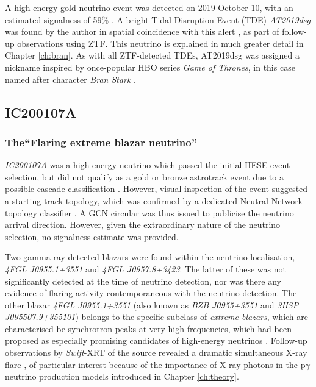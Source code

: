 A high-energy gold neutrino event was detected on 2019 October 10, with an estimated signalness of 59\% . A bright Tidal Disruption Event (TDE) \emph{AT2019dsg} was found by the author in spatial coincidence with this alert , as part of follow-up observations using ZTF. This neutrino is explained in much greater detail in Chapter \ref{ch:bran}. As with all ZTF-detected TDEs, AT2019dsg was assigned a nickname inspired by once-popular HBO series \emph{Game of Thrones}, in this case named after character \emph{Bran Stark} .

\subsection{IC200107A }
\subsubsection{The``Flaring extreme blazar neutrino''}

\emph{IC200107A} was a high-energy neutrino which passed the initial HESE event selection, but did not qualify as a gold or bronze astrotrack event due to a possible cascade classification . However, visual inspection of the event suggested a starting-track topology, which was confirmed by a dedicated Neutral Network topology classifier . A GCN circular was thus issued to publicise the neutrino arrival direction. However, given the extraordinary nature of the neutrino selection, no signalness estimate was provided.

Two gamma-ray detected blazars were found within the neutrino localisation, \emph{4FGL J0955.1+3551} and \emph{4FGL J0957.8+3423}. The latter of these was not significantly detected at the time of neutrino detection, nor was there any evidence of flaring activity contemporaneous with the neutrino detection. The other blazar \emph{4FGL J0955.1+3551} (also known as \emph{BZB J0955+3551} and \emph{3HSP J095507.9+355101}) belongs to the specific subclass of \emph{extreme blazars}, which are characterised be synchrotron peaks at very high-frequencies, which had been proposed as especially promising candidates of high-energy neutrinos . Follow-up observations by \emph{Swift}-XRT of the source revealed a dramatic simultaneous X-ray flare , of particular interest because of the importance of X-ray photons in the p$\gamma$ neutrino production models introduced in Chapter \ref{ch:theory}.

